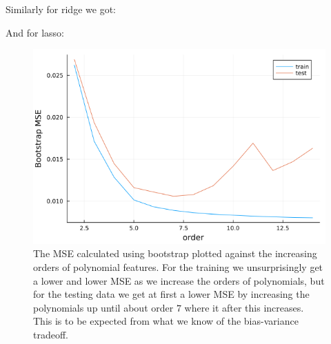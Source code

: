 \documentclass{article}
\begin{document}
Similarly for ridge we got:

\begin{table}[htpb!]
\end{table}

And for lasso:
\begin{table}[htpb!]
\end{table}

\begin{figure}
    \includegraphics[scale=0.5]{bootstrapbiasvariance}
    \caption{The MSE calculated using bootstrap plotted against the increasing
        orders of polynomial features. For the training we unsurprisingly get a
        lower and lower MSE as we increase the orders of polynomials, but for the
        testing data we get at first a lower MSE by increasing the polynomials up
        until about order $7$ where it after this increases. This is to be expected
        from what we know of the bias-variance tradeoff.}
    \label{bootstrap-bias-var}
\end{figure}
\end{document}
